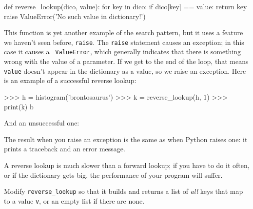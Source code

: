 \beforeverb
\begin{pycode}
def reverse_lookup(dico, value):
    for key in dico:
        if dico[key] == value:
            return key
    raise ValueError('No such value in dictionary!')
\end{pycode}
\afterverb
%
This function is yet another example of the search pattern, but it
uses a feature we haven't seen before, {\tt raise}.  The {\tt raise}
statement causes an exception; in this case it causes a {\tt
  ValueError}, which generally indicates that there is something wrong
with the value of a parameter.
%
%
If we get to the end of the loop, that means {\tt value}
doesn't appear in the dictionary as a value, so we raise an
exception.
%
Here is an example of a successful reverse lookup:

\beforeverb
\begin{pyinterpreter}
>>> h = histogram('brontosaurus')
>>> k = reverse_lookup(h, 1)
>>> print(k)
b
\end{pyinterpreter}
\afterverb
%
And an unsuccessful one:

\beforeverb
{}
\afterverb
%
The result when you raise an exception is the same as when
Python raises one: it prints a traceback and an error message.
%
%
%

A reverse lookup is much slower than a forward lookup; if you
have to do it often, or if the dictionary gets big, the performance
of your program will suffer.

\begin{exercise}
Modify \verb"reverse_lookup" so that it builds and returns a list
of {\em all} keys that map to a value {\tt v}, or an empty list if there
are none.
\end{exercise}


